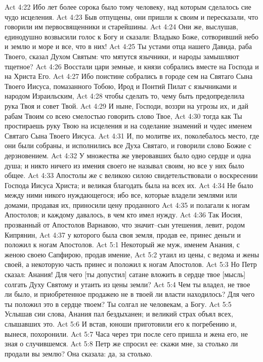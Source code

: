 Act 4:22  Ибо лет более сорока было тому человеку, над которым сделалось сие чудо исцеления.
Act 4:23  Быв отпущены, они пришли к своим и пересказали, что говорили им первосвященники и старейшины.
Act 4:24  Они же, выслушав, единодушно возвысили голос к Богу и сказали: Владыко Боже, сотворивший небо и землю и море и все, что в них!
Act 4:25  Ты устами отца нашего Давида, раба Твоего, сказал Духом Святым: что мятутся язычники, и народы замышляют тщетное?
Act 4:26  Восстали цари земные, и князи собрались вместе на Господа и на Христа Его.
Act 4:27  Ибо поистине собрались в городе сем на Святаго Сына Твоего Иисуса, помазанного Тобою, Ирод и Понтий Пилат с язычниками и народом Израильским,
Act 4:28  чтобы сделать то, чему быть предопределила рука Твоя и совет Твой.
Act 4:29  И ныне, Господи, воззри на угрозы их, и дай рабам Твоим со всею смелостью говорить слово Твое,
Act 4:30  тогда как Ты простираешь руку Твою на исцеления и на соделание знамений и чудес именем Святаго Сына Твоего Иисуса.
Act 4:31  И, по молитве их, поколебалось место, где они были собраны, и исполнились все Духа Святаго, и говорили слово Божие с дерзновением.
Act 4:32  У множества же уверовавших было одно сердце и одна душа; и никто ничего из имения своего не называл своим, но все у них было общее.
Act 4:33  Апостолы же с великою силою свидетельствовали о воскресении Господа Иисуса Христа; и великая благодать была на всех их.
Act 4:34  Не было между ними никого нуждающегося; ибо все, которые владели землями или домами, продавая их, приносили цену проданного
Act 4:35  и полагали к ногам Апостолов; и каждому давалось, в чем кто имел нужду.
Act 4:36  Так Иосия, прозванный от Апостолов Варнавою, что значит--сын утешения, левит, родом Кипрянин,
Act 4:37  у которого была своя земля, продав ее, принес деньги и положил к ногам Апостолов.
Act 5:1  Некоторый же муж, именем Анания, с женою своею Сапфирою, продав имение,
Act 5:2  утаил из цены, с ведома и жены своей, а некоторую часть принес и положил к ногам Апостолов.
Act 5:3  Но Петр сказал: Анания! Для чего [ты допустил] сатане вложить в сердце твое [мысль] солгать Духу Святому и утаить из цены земли?
Act 5:4  Чем ты владел, не твое ли было, и приобретенное продажею не в твоей ли власти находилось? Для чего ты положил это в сердце твоем? Ты солгал не человекам, а Богу.
Act 5:5  Услышав сии слова, Анания пал бездыханен; и великий страх объял всех, слышавших это.
Act 5:6  И встав, юноши приготовили его к погребению и, вынеся, похоронили.
Act 5:7  Часа через три после сего пришла и жена его, не зная о случившемся.
Act 5:8  Петр же спросил ее: скажи мне, за столько ли продали вы землю? Она сказала: да, за столько.
